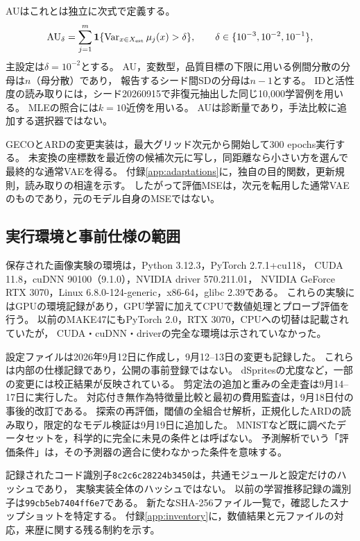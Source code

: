 \documentclass[11pt,a4paper]{ltjsarticle}
\begin{document}
AUはこれとは独立に次式で定義する。
\begin{equation}
 \mathrm{AU}_\delta=\sum_{j=1}^{m}
 \mathbf1\{\operatorname{Var}_{x\in X_{\rm est}}\mu_j(x)>\delta\},
 \qquad \delta\in\{10^{-3},10^{-2},10^{-1}\},
 \label{eq:au}
\end{equation}
主設定は$\delta=10^{-2}$とする。
AU，変数型，品質目標の下限に用いる例間分散の分母は$n$（母分散）であり，
報告するシード間SDの分母は$n-1$とする。
IDと活性度の読み取りには，シード20260915で非復元抽出した同じ10,000学習例を用いる。
MLEの照合には$k=10$近傍を用いる。
AUは診断量であり，手法比較に追加する選択器ではない。

GECOとARDの変更実装は，最大グリッド次元から開始して300 epochs実行する。
未変換の座標数を最近傍の候補次元に写し，同距離なら小さい方を選んで最終的な通常VAEを得る。
付録\ref{app:adaptations}に，独自の目的関数，更新規則，読み取りの相違を示す。
したがって評価MSEは，次元を転用した通常VAEのものであり，元のモデル自身のMSEではない。

\subsection{実行環境と事前仕様の範囲}\label{sec:provenance}
保存された画像実験の環境は，Python 3.12.3，PyTorch 2.7.1+cu118，
CUDA 11.8，cuDNN 90100（9.1.0），NVIDIA driver 570.211.01，
NVIDIA GeForce RTX 3070，Linux 6.8.0-124-generic，x86-64，glibc 2.39である。
これらの実験にはGPUの環境記録があり，GPU学習に加えてCPUで数値処理とプローブ評価を行う。
以前のMAKE47にもPyTorch 2.0，RTX 3070，CPUへの切替は記載されていたが，
CUDA・cuDNN・driverの完全な環境は示されていなかった。

設定ファイルは2026年9月12日に作成し，9月12--13日の変更も記録した。
これらは内部の仕様記録であり，公開の事前登録ではない。
dSpritesの尤度など，一部の変更には校正結果が反映されている。
剪定法の追加と重みの全走査は9月14--17日に実行した。
対応付き無作為特徴量比較と最初の費用監査は，9月18日付の事後的改訂である。
探索の再評価，閾値の全組合せ解析，正規化したARDの読み取り，限定的なモデル検証は9月19日に追加した。
MNISTなど既に調べたデータセットを，科学的に完全に未見の条件とは呼ばない。
予測解析でいう「評価条件」は，その予測器の適合に使わなかった条件を意味する。

記録されたコード識別子\texttt{8c2c6c28224b3450}は，共通モジュールと設定だけのハッシュであり，
実験実装全体のハッシュではない。
以前の学習推移記録の識別子は\texttt{99cb5eb7404ff6e7}である。
新たなSHA-256ファイル一覧で，確認したスナップショットを特定する。
付録\ref{app:inventory}に，数値結果と元ファイルの対応，来歴に関する残る制約を示す。
\end{document}
